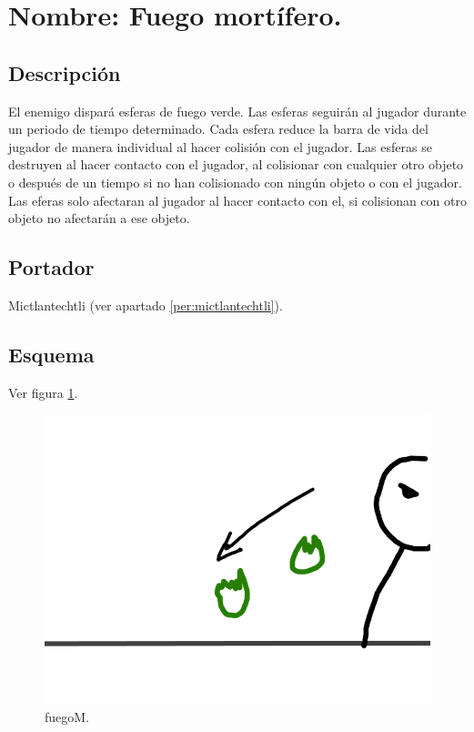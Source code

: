 \section{Nombre: Fuego mortífero.} \label{hab.FuegoMor}
\subsection{Descripción}
El enemigo dispará esferas de fuego verde. Las esferas seguirán al jugador durante un periodo de tiempo determinado. Cada esfera reduce la barra de vida del jugador de manera individual al hacer colisión con el jugador. Las esferas se destruyen al hacer contacto con el jugador, al colisionar con cualquier otro objeto o después de un tiempo si no han colisionado con ningún objeto o con el jugador. Las eferas solo afectaran al jugador al hacer contacto con el, si colisionan con otro objeto no afectarán a ese objeto. 
\subsection{Portador}
Mictlantechtli (ver apartado \ref{per:mictlantechtli}).	
\subsection{Esquema}	
			Ver figura \ref{fig:fuegoM}.
			\begin{figure}
				\centering
				\includegraphics[height=0.2 \textheight]{Imagenes/fuegoM}
				\caption{fuegoM.}
				\label{fig:fuegoM}
			\end{figure}
